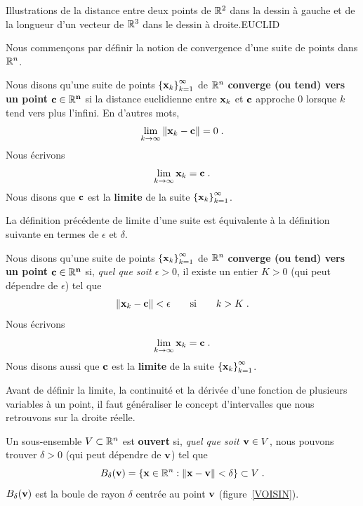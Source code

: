 {
{Illustrations de la distance entre deux points de $\mathbb{R}^2$ dans la
dessin à gauche et de la longueur d'un vecteur de $\mathbb{R}^3$ dans le
dessin à droite.}{EUCLID}

Nous commençons par définir la notion de convergence d'une suite de points
dans $\mathbb{R}^n$.

\begin{defn}
Nous disons qu'une suite de points
$\displaystyle \left\{\mathbf{x}_k\right\}_{k=1}^\infty$ de $\mathbb{R}^n$
{\bfseries converge (ou tend) vers un point
$\mathbf{\mathbf{c} \in \mathbb{R}^n}$} si la
distance euclidienne entre $\mathbf{x}_k$ et $\mathbf{c}$ approche $0$
lorsque $k$ tend vers plus l'infini.  En d'autres mots,
\[
\lim_{k\rightarrow \infty} \|\mathbf{x}_k-\mathbf{c}\| = 0 \; .
\]
Nous écrivons
\[
\lim_{k\rightarrow \infty} \mathbf{x}_k = \mathbf{c} \; .
\]
Nous disons que $\mathbf{c}$ est la {\bfseries limite} de
la suite $\displaystyle \left\{\mathbf{x}_k\right\}_{k=1}^\infty$.
\end{defn}

La définition précédente de limite d'une suite est équivalente à la
définition suivante en termes de $\epsilon$ et $\delta$.

\begin{defn}[+\theory]
Nous disons qu'une suite de points 
$\displaystyle \left\{\mathbf{x}_k\right\}_{k=1}^\infty$ de $\mathbb{R}^n$
{\bfseries converge (ou tend) vers un point
$\mathbf{\mathbf{c} \in \mathbb{R}^n}$} si,
{\em quel que soit $\epsilon >0$}, il existe un entier $K>0$ (qui peut
dépendre de $\epsilon$) tel que
\[
\| \mathbf{x}_k - \mathbf{c} \| < \epsilon \qquad \text{si} \qquad k>K \; .
\]
Nous écrivons
\[
\lim_{k\rightarrow \infty} \mathbf{x}_k = \mathbf{c} \; .
\]
Nous disons aussi que $\mathbf{c}$ est la {\bfseries limite}
de la suite $\displaystyle \left\{\mathbf{x}_k\right\}_{k=1}^\infty$.
\end{defn}

Avant de définir la limite, la continuité et la dérivée d'une fonction
de plusieurs variables à un point, il faut généraliser le concept
d'intervalles que nous retrouvons sur la droite réelle.

\begin{defn}
Un sous-ensemble $V \subset \mathbb{R}^n$ est
{\bfseries ouvert} si,
{\em quel que soit $\mathbf{v} \in V$}, nous pouvons trouver $\delta>0$ (qui
peut dépendre de $\mathbf{v}$) tel que
\[
B_\delta(\mathbf{v}) = \{ \mathbf{x} \in \mathbb{R}^n : \|\mathbf{x} - \mathbf{v}\| <
\delta \} \subset V \; .
\]
$\displaystyle B_\delta(\mathbf{v})$ est la boule de rayon $\delta$
centrée au point $\mathbf{v}$ (figure~\ref{VOISIN}).


\end{defn}}

